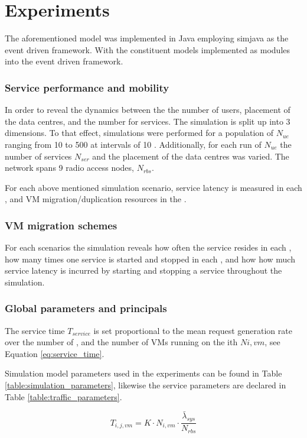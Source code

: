 \section{Experiments}
The aforementioned model was implemented in Java employing simjava \cite{SimJava} as the event driven framework. With the constituent models implemented as modules into the event driven framework.

\subsubsection{Service performance and mobility}

In order to reveal the dynamics between the the number of users, placement of the data centres, and the number for services. The simulation is split up into 3 dimensions. To that effect, simulations were performed for a population of \ues{} $N_{ue}$ ranging from 10 to 500 \ues{} at intervals of 10 \ues{}. Additionally, for each run of $N_{ue}$ the number of services $N_{ser}$ and the placement of the data centres was varied. The network spans 9 radio access nodes, $N_{rbs}$.

For each above mentioned simulation scenario, service latency is measured in each \ue{}, and VM migration/duplication resources in the \dc{}.

\subsubsection{VM migration schemes}
For each scenarios the simulation reveals how often the service resides in each \dc{}, how many times one service is started and stopped in each \dc{}, and how how much service latency is incurred by starting and stopping a service throughout the simulation.

\subsubsection{Global parameters and principals}
The \dc service time $T_{service}$ is set proportional to the mean request generation rate over the number of \rbss{}, and the number of VMs running on the ith \dc $N{i,vm}$, see Equation \ref{eq:service_time}.

Simulation model parameters used in the experiments can be found in Table \ref{table:simulation_parameters}, likewise the service parameters are declared in Table \ref{table:traffic_parameters}.

\begin{equation}
\label{eq:service_time}
T_{i,j,vm} = K \cdot N_{i,vm} \cdot \frac{ \bar{\lambda}_{sys} }{N_{rbs}}
\end{equation}

